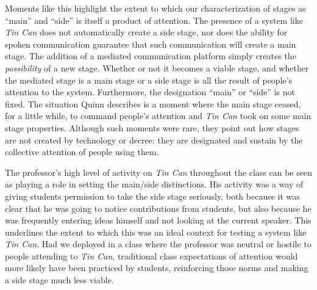 

Moments like this highlight the extent to which our characterization of stages as ``main'' and ``side'' is itself a product of attention. The presence of a system like \emph{Tin Can} does not automatically create a side stage, nor does the ability for spoken communication guarantee that such communication will create a main stage.  The addition of a mediated communication platform simply creates the \emph{possibility} of a new stage. Whether or not it becomes a viable stage, and whether the mediated stage is a main stage or a side stage is all the result of people's attention to the system. Furthermore, the designation ``main'' or ``side'' is not fixed. The situation Quinn describes is a moment where the main stage ceased, for a little while, to command people's attention and \emph{Tin Can} took on some main stage properties. Although such moments were rare, they point out how stages are not created by technology or decree: they are designated and sustain by the collective attention of people using them.


The professor's high level of activity on \emph{Tin Can} throughout the class can be seen as playing a role in setting the main/side distinctions. His activity was a way of giving students permission to take the side stage seriously, both because it was clear that he was going to notice contributions from students, but also because he was frequently entering ideas himself and not looking at the current speaker. This underlines the extent to which this was an ideal context for testing a system like \emph{Tin Can}. Had we deployed in a class where the professor was neutral or hostile to people attending to \emph{Tin Can}, traditional class expectations of attention would more likely have been practiced by students, reinforcing those norms and making a side stage much less viable.





